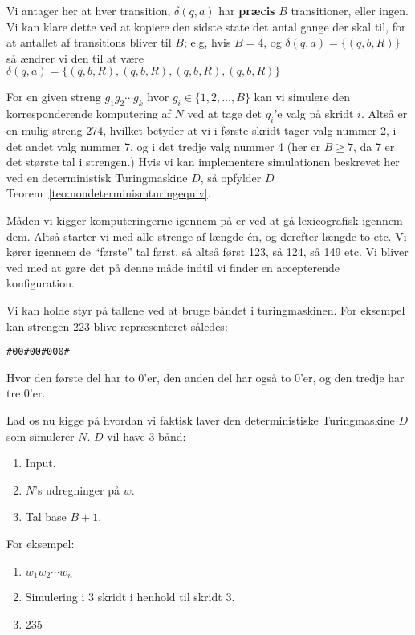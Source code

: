 Vi antager her at hver transition, $\delta(q,a)$ har \textbf{præcis} $B$ transitioner, eller ingen. Vi kan klare dette ved at kopiere den sidste state det antal gange der skal til, for at antallet af transitions bliver til $B$; e.g, hvis $B = 4$, og $\delta(q,a) = \{(q, b, R)\}$ så ændrer vi den til at være $\delta(q,a) = \{(q,b,R),(q,b,R),(q,b,R),(q,b,R)\}$

For en given streng $g_{1}g_{2}\cdots g_{k}$ hvor $g_{i} \in \{1, 2, \ldots, B\}$ kan vi simulere den korresponderende komputering af $N$  ved at tage det $g_{i}$'e valg på skridt $i$. Altså er en mulig streng 274, hvilket betyder at vi i første skridt tager valg nummer 2, i det andet valg nummer 7, og i det tredje valg nummer 4 (her er $B \ge 7$, da 7 er det største tal i strengen.) Hvis vi kan implementere simulationen beskrevet her ved en deterministisk Turingmaskine $D$, så opfylder $D$ Teorem~\ref{teo:nondeterminismturingequiv}.

Måden vi kigger komputeringerne igennem på er ved at gå lexicografisk igennem dem. Altså starter vi med alle strenge af længde én, og derefter længde to etc. Vi kører igennem de ``første'' tal først, så altså først 123, så 124, så 149 etc. Vi bliver ved med at gøre det på denne måde indtil vi finder en accepterende konfiguration.

Vi kan holde styr på tallene ved at bruge båndet i turingmaskinen. For eksempel kan strengen 223 blive repræsenteret således:
\begin{center}
\texttt{\#00\#00\#000\#}
\end{center}
Hvor den første del har to 0'er, den anden del har også to 0'er, og den tredje har tre 0'er.

Lad os nu kigge på hvordan vi faktisk laver den deterministiske Turingmaskine $D$ som simulerer $N$.
$D$ vil have 3 bånd:
\begin{enumerate}
  \item Input.
  \item $N$'s udregninger på $w$.
  \item Tal base $B+1$.
\end{enumerate}

For eksempel:
\begin{enumerate}
  \item $w_{1}w_{2} \cdots w_{n}$
  \item Simulering i 3 skridt i henhold til skridt 3.
  \item 235
\end{enumerate}

